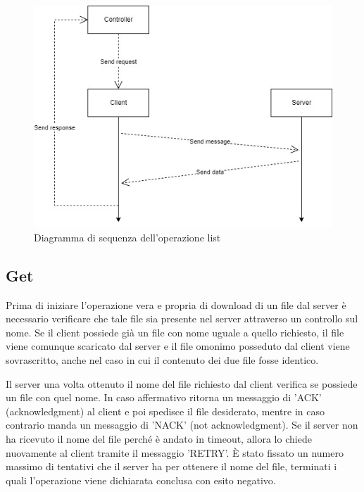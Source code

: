 \documentclass[a4paper,12pt]{report}
\begin{document}
\begin{figure}[H]
    \centering
    \includegraphics[scale=0.55]{img/list.jpg}
    \caption{Diagramma di sequenza dell'operazione list}
\end{figure}

\subsection{Get}
Prima di iniziare l'operazione vera e propria di download di un file dal server è necessario verificare che tale file sia presente nel server attraverso un controllo sul nome. Se il client possiede già un file con nome uguale a quello richiesto, il file viene comunque scaricato dal server e il file omonimo posseduto dal client viene sovrascritto, anche nel caso in cui il contenuto dei due file fosse identico.

Il server una volta ottenuto il nome del file richiesto dal client verifica se possiede un file con quel nome. In caso affermativo ritorna un messaggio di 'ACK' (acknowledgment) al client e poi spedisce il file desiderato, mentre in caso contrario manda un messaggio di 'NACK' (not acknowledgment). Se il server non ha ricevuto il nome del file perché è andato in timeout, allora lo chiede nuovamente al client tramite il messaggio 'RETRY'. \MakeUppercase{è} stato fissato un numero massimo di tentativi che il server ha per ottenere il nome del file, terminati i quali l'operazione viene dichiarata conclusa con esito negativo.
\end{document}
